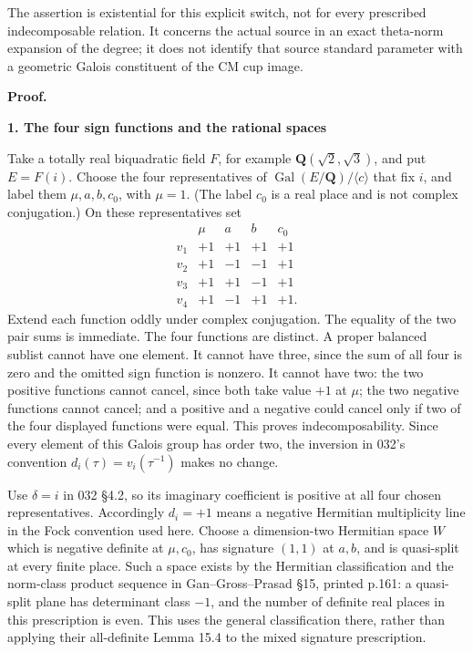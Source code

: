 \documentclass[11pt,a4paper]{article}
\theoremstyle{definition}
\begin{document}
The assertion is existential for this explicit switch, not for every prescribed indecomposable relation. It concerns the actual source in an exact theta-norm expansion of the degree; it does not identify that source standard parameter with a geometric Galois constituent of the CM cup image.

\textbf{Proof.}

\textbf{1. The four sign functions and the rational spaces}

Take a totally real biquadratic field \(F\), for example \(\mathbf Q(\sqrt2,\sqrt3)\), and put \(E=F(i)\). Choose the four representatives of \(\operatorname{Gal}(E/\mathbf Q)/\langle c\rangle\) that fix \(i\), and label them \(\mu,a,b,c_0\), with \(\mu=1\). (The label \(c_0\) is a real place and is not complex conjugation.) On these representatives set \[
\begin{array}{c|rrrr}
 &\mu&a&b&c_0\\\hline
v_1&+1&+1&+1&+1\\
v_2&+1&-1&-1&+1\\
v_3&+1&+1&-1&+1\\
v_4&+1&-1&+1&+1.
\end{array}
\tag{T16.2}
\] Extend each function oddly under complex conjugation. The equality of the two pair sums is immediate. The four functions are distinct. A proper balanced sublist cannot have one element. It cannot have three, since the sum of all four is zero and the omitted sign function is nonzero. It cannot have two: the two positive functions cannot cancel, since both take value \(+1\) at \(\mu\); the two negative functions cannot cancel; and a positive and a negative could cancel only if two of the four displayed functions were equal. This proves indecomposability. Since every element of this Galois group has order two, the inversion in 032's convention \(d_i(\tau)=v_i(\tau^{-1})\) makes no change.

Use \(\delta=i\) in 032 §4.2, so its imaginary coefficient is positive at all four chosen representatives. Accordingly \(d_i=+1\) means a negative Hermitian multiplicity line in the Fock convention used here. Choose a dimension-two Hermitian space \(W\) which is negative definite at \(\mu,c_0\), has signature \((1,1)\) at \(a,b\), and is quasi-split at every finite place. Such a space exists by the Hermitian classification and the norm-class product sequence in Gan--Gross--Prasad §15, printed p.161: a quasi-split plane has determinant class \(-1\), and the number of definite real places in this prescription is even. This uses the general classification there, rather than applying their all-definite Lemma 15.4 to the mixed signature prescription.
\end{document}

